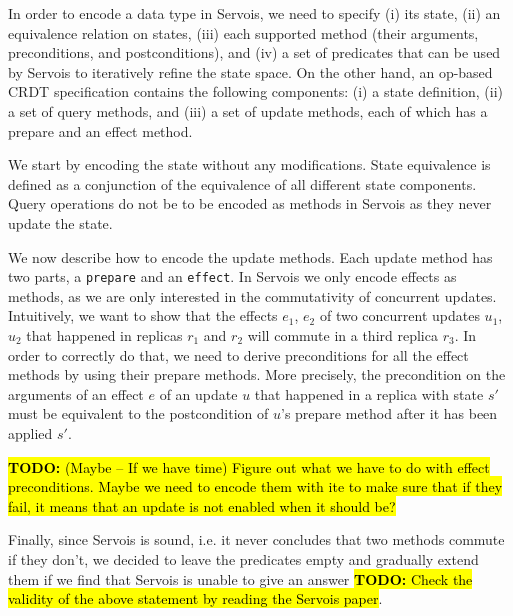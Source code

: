 \documentclass{article}
\newcommand{\TODO}[1]{\hl{\textbf{TODO:} #1}\xspace}
\begin{document}
In order to encode a data type in Servois, we need to specify (i) its
state, (ii) an equivalence relation on states, (iii) each supported
method (their arguments, preconditions, and postconditions), and (iv)
a set of predicates that can be used by Servois to iteratively refine
the state space. On the other hand, an op-based CRDT specification
contains the following components: (i) a state definition, (ii) a set
of query methods, and (iii) a set of update methods, each of which has
a prepare and an effect method.

We start by encoding the state without any modifications. State
equivalence is defined as a conjunction of the equivalence of all
different state components. Query operations do not be to be encoded
as methods in Servois as they never update the state.

We now describe how to encode the update methods. Each update method
has two parts, a \texttt{prepare} and an \texttt{effect}. In Servois
we only encode effects as methods, as we are only interested in the
commutativity of concurrent updates.
Intuitively, we want to show that the effects $e_1$, $e_2$ of two
concurrent updates $u_1$, $u_2$ that happened in replicas $r_1$ and
$r_2$ will commute in a third replica $r_3$. In order to correctly do
that, we need to derive preconditions for all the effect methods by
using their prepare methods. More precisely, the precondition on the
arguments of an effect $e$ of an update $u$ that happened in a replica
with state $s'$ must be equivalent to the postcondition of $u$'s
prepare method after it has been applied $s'$.

\TODO{(Maybe -- If we have time) Figure out what we have to do with
  effect preconditions. Maybe we need to encode them with ite to make
  sure that if they fail, it means that an update is not enabled when
  it should be?}


Finally, since Servois is sound, i.e. it never concludes that two
methods commute if they don't, we decided to leave the predicates
empty and gradually extend them if we find that Servois is unable to
give an answer \TODO{Check the validity of the above statement by
  reading the Servois paper}.
\end{document}
